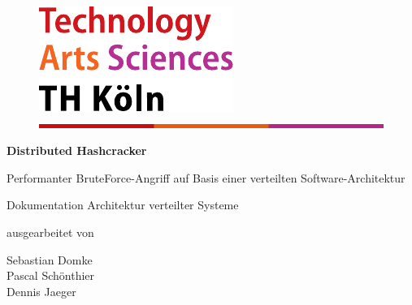 
\begin{titlepage}

\begin{center}
\begin{figure}[!ht]
	\flushright
		\includegraphics[width=.2\textwidth]{images/logo.pdf}
		\includegraphics[width=\textwidth]{images/balken.png}
\end{figure}

\vspace{1.5cm}


\begin{rmfamily}
\begin{huge}
\textbf{Distributed Hashcracker}\\	
\end{huge}
\vspace{0.5cm}
\begin{LARGE}
Performanter BruteForce-Angriff auf Basis einer verteilten Software-Architektur
\end{LARGE}

\end{rmfamily}

\vspace{1.6cm}

\begin{LARGE}
\begin{scshape}
Dokumentation Architektur verteilter Systeme\\[0.8em]
\end{scshape}
\end{LARGE}

\begin{large}
ausgearbeitet von\\ 
\vspace{0.2cm}
\begin{LARGE}
Sebastian Domke\\
Pascal Schönthier\\
Dennis Jaeger\\
\end{LARGE}
\end{large}

\vspace{1.0cm}


\end{center}
\end{titlepage}
